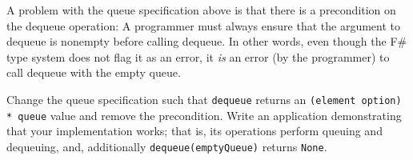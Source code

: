 A problem with the queue specification above is that there is a precondition on the dequeue operation: A programmer must always ensure that the argument to dequeue is nonempty before calling dequeue. In other words, even though the F\# type system does not flag it as an error, it \emph{is} an error (by the programmer) to call dequeue with the empty queue.

Change the queue specification such that \lstinline{dequeue} returns an \lstinline{(element option) * queue} value and remove the precondition.  Write an application demonstrating that your implementation works; that is, its operations perform queuing and dequeuing, and, additionally \lstinline{dequeue(emptyQueue)} returns \lstinline{None}.